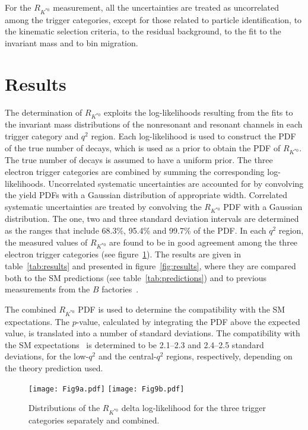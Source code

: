 \documentclass[12pt,a4paper]{article}
\def\RKst    {\mbox{R_{\Kstarz}}}
\def\PB      {\ensuremath{\mathrm{B}}\xspace}
\def\PK      {\ensuremath{\mathrm{K}}\xspace}
\def\PB      {\ensuremath{B}\xspace}
\def\PK      {\ensuremath{K}\xspace}
\def\kaon  {\ensuremath{\PK}\xspace}
\def\Kstarz  {\ensuremath{\kaon^{*0}}\xspace}
\def\B       {\ensuremath{\PB}\xspace}
\def\qsq       {\ensuremath{q^2}\xspace}
\def\RKst{\ensuremath{R_{\Kstarz}}\xspace}
\begin{document}
For the \RKst measurement, all the uncertainties are treated as uncorrelated among the trigger categories, except for those related to particle identification, to the kinematic selection criteria, to the residual background, to the fit to the invariant mass and to bin migration.
 

\section{Results}
\label{sec:results}

The determination of \RKst exploits the log-likelihoods resulting from the fits to the invariant mass distributions of the nonresonant and resonant channels in each trigger category and \qsq region.
Each log-likelihood is used to construct the PDF of the true number of decays, which is used as a prior to obtain the PDF of \RKst.
The true number of decays is assumed to have a uniform prior.
The three electron trigger categories are combined by summing the corresponding log-likelihoods.
Uncorrelated systematic uncertainties are accounted for by convolving the yield PDFs with a Gaussian distribution of appropriate width.
Correlated systematic uncertainties are treated by convolving the \RKst PDF with a Gaussian distribution. 
The one, two and three standard deviation intervals are determined as the ranges that include 68.3\%, 95.4\% and 99.7\% of the PDF.
In each \qsq region, the measured values of \RKst are found to be in good agreement among the three electron trigger categories (see figure~\ref{fig:LL}).
The results are given in table~\ref{tab:results} and presented in figure~\ref{fig:results}, where they are compared both to the SM predictions (see table~\ref{tab:predictions}) and to previous measurements from the \B factories~\cite{Lees:2012tva,Wei:2009zv}.

The combined \RKst PDF is used to determine the compatibility with the SM expectations.
The $p$-value, calculated by integrating the PDF above the expected value, is translated into a number of standard deviations. 
The compatibility with the SM expectations~\cite{Bordone:2016gaq,Descotes-Genon:2015uva,Capdevila:2016ivx,Capdevila:2017ert,Serra:2016ivr,EOS-Web,*EOS,Straub:2015ica,Altmannshofer:2017fio,flavio,Jager:2014rwa} is determined to be 2.1--2.3 and 2.4--2.5 standard deviations, for the low-\qsq and the  central-\qsq  regions, respectively, depending on the theory prediction used.

\begin{figure}[t!]
\centering
\texttt{[image: Fig9a.pdf]}
\texttt{[image: Fig9b.pdf]}
\caption{Distributions of the \RKst delta log-likelihood for the three trigger categories separately and combined.}
\label{fig:LL}
\end{figure}
\end{document}
